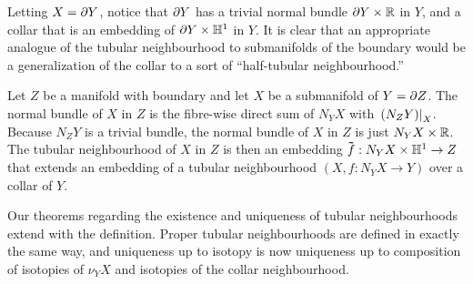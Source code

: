 Letting $X=\partial Y$, notice that $\partial Y$ has a trivial normal bundle $\partial Y\times \mathbb{R}$ in $Y$, and a collar that is an embedding of $\partial Y\times\mathbb{H}^1$ in $Y$.
It is clear that an appropriate analogue of the tubular neighbourhood to submanifolds of the boundary would be a generalization of the collar to a sort of ``half-tubular neighbourhood.''

\begin{defn}
	\label{def:halfneighbourhood}
	Let $Z$ be a manifold with boundary and let $X$ be a submanifold of $Y=\partial Z$.
	The normal bundle of $X$ in $Z$ is the fibre-wise direct sum of $N_Y X$ with $\left.(N_Z Y)\right|_{X}$.
	Because $N_Z Y$ is a trivial bundle, the normal bundle of $X$ in $Z$ is just $N_Y X\times \mathbb{R}$.
	The tubular neighbourhood of $X$ in $Z$ is then an embedding $\mathbf{\tilde{\text{$f$}}}:N_Y X\times \mathbb{H}^1\to Z$ that extends an embedding of a tubular neighbourhood $(X,f:N_Y X\to Y)$ over a collar of $Y$.
\end{defn}

Our theorems regarding the existence and uniqueness of tubular neighbourhoods extend with the definition.
Proper tubular neighbourhoods are defined in exactly the same way, and uniqueness up to isotopy is now uniqueness up to composition of isotopies of $\nu_Y X$ and isotopies of the collar neighbourhood.